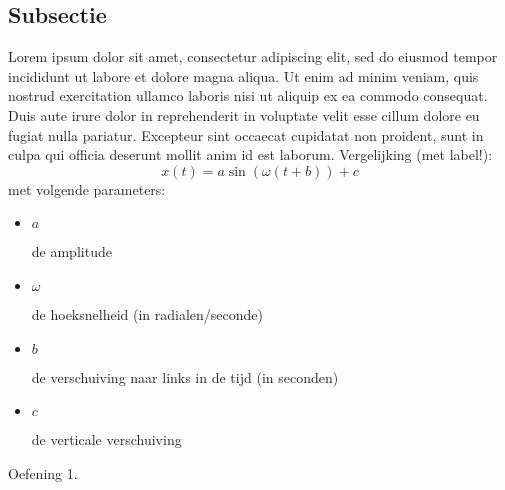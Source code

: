 \subsection{Subsectie}
\label{ssec:Subsectie}
%
Lorem ipsum dolor sit amet, consectetur adipiscing elit, sed do eiusmod tempor incididunt ut labore et dolore magna aliqua. Ut enim ad minim veniam, quis nostrud exercitation ullamco laboris nisi ut aliquip ex ea commodo consequat. Duis aute irure dolor in reprehenderit in voluptate velit esse cillum dolore eu fugiat nulla pariatur. Excepteur sint occaecat cupidatat non proident, sunt in culpa qui officia deserunt mollit anim id est laborum.
%
%
Vergelijking (met label!):
%
\begin{equation}
x(t)=a \sin (\omega(t+b))+c
\label{eq:algemene-sinus}
\end{equation}
%
met volgende parameters:
\begin{itemize}
	\item \parbox{1cm}{$a$} de amplitude
	\item \parbox{1cm}{$\omega$} de hoeksnelheid (in radialen/seconde)
	\item \parbox{1cm}{$b$} de verschuiving naar links in de tijd (in seconden)
	\item \parbox{1cm}{$c$} de verticale verschuiving
\end{itemize}
%
%
\begin{oef}
	Oefening 1.
\end{oef}
%
%
%
